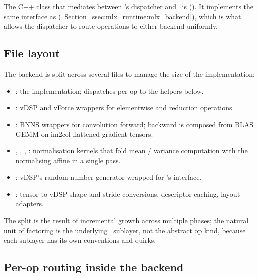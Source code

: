 The C++ class that mediates between \Lucid's dispatcher and
\Accelerate\ is 
(). It
implements the same  interface as 
(~Section~\ref{ssec:mlx_runtime:mlx_backend}),
which is what allows the dispatcher to route operations to either
backend uniformly.

\subsection{File layout}
\label{ssec:accelerate:file_layout}

The backend is split across several files to manage the size of the
implementation:

\begin{itemize}
  \item {}: the 
    implementation; dispatches per-op to the helpers below.
  \item {}: vDSP and vForce wrappers for
    elementwise and reduction operations.
  \item {}: BNNS wrappers for convolution
    forward; backward is composed from BLAS GEMM on im2col-flattened
    gradient tensors.
  \item {}, ,
    , :
    normalisation kernels that fold mean / variance computation
    with the normalising affine in a single pass.
  \item {}: vDSP's random number generator
    wrapped for \Lucid's  interface.
  \item {}: tensor-to-vDSP shape and stride
    conversions, descriptor caching, layout adapters.
\end{itemize}

The split is the result of incremental growth across multiple
phases; the natural unit of factoring is the underlying
\Accelerate\ sublayer, not the abstract op kind, because each
sublayer has its own conventions and quirks.

\subsection{Per-op routing inside the backend}
\label{ssec:accelerate:per_op}

